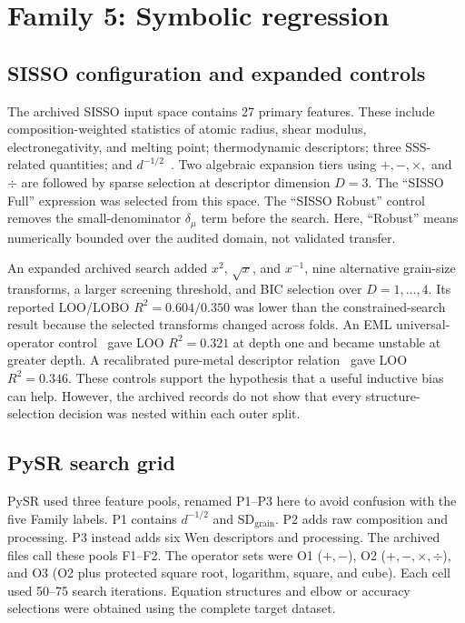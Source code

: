 \documentclass[a4paper,11pt]{article}
\newcommand{\familyfive}{Symbolic regression}
\begin{document}
\section{Family 5: \familyfive}
\label{si:sr}

\subsection{SISSO configuration and expanded controls}

The archived SISSO input space contains 27 primary features. These include composition-weighted statistics of atomic radius, shear modulus, electronegativity, and melting point; thermodynamic descriptors; three SSS-related quantities; and $d^{-1/2}$~\cite{Oliynyk2016,Ouyang2018SISSO}. Two algebraic expansion tiers using $+,-,\times,$ and $\div$ are followed by sparse selection at descriptor dimension $D=3$. The ``SISSO Full'' expression was selected from this space. The ``SISSO Robust'' control removes the small-denominator $\delta_\mu$ term before the search. Here, ``Robust'' means numerically bounded over the audited domain, not validated transfer.

An expanded archived search added $x^2$, $\sqrt{x}$, and $x^{-1}$, nine alternative grain-size transforms, a larger screening threshold, and BIC selection over $D=1,\ldots,4$. Its reported LOO/LOBO $R^2=0.604/0.350$ was lower than the constrained-search result because the selected transforms changed across folds. An EML universal-operator control~\cite{Odrzywolek2025} gave LOO $R^2=0.321$ at depth one and became unstable at greater depth. A recalibrated pure-metal descriptor relation~\cite{Jiang2022HP} gave LOO $R^2=0.346$. These controls support the hypothesis that a useful inductive bias can help. However, the archived records do not show that every structure-selection decision was nested within each outer split.

\subsection{PySR search grid}

PySR used three feature pools, renamed P1--P3 here to avoid confusion with the five Family labels. P1 contains $d^{-1/2}$ and $\mathrm{SD}_{\mathrm{grain}}$. P2 adds raw composition and processing. P3 instead adds six Wen descriptors and processing. The archived files call these pools F1--F2. The operator sets were O1 ($+,-$), O2 ($+,-,\times,\div$), and O3 (O2 plus protected square root, logarithm, square, and cube). Each cell used 50--75 search iterations. Equation structures and elbow or accuracy selections were obtained using the complete target dataset.
\end{document}
